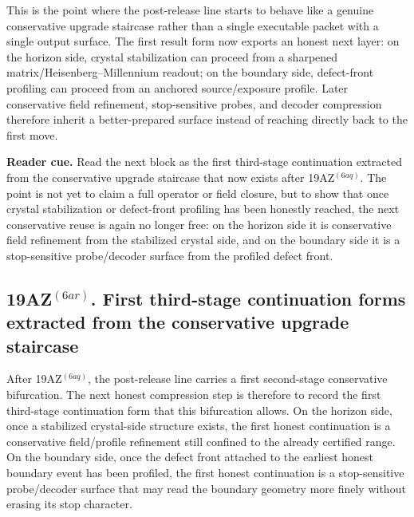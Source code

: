 \begin{remark}
\label{rem:what-the-first-second-stage-follow-on-form-now-buys}
This is the point where the post-release line starts to behave like a genuine conservative upgrade staircase rather than a single executable packet with a single output surface. The first result form now exports an honest next layer: on the horizon side, crystal stabilization can proceed from a sharpened matrix/Heisenberg--Millennium readout; on the boundary side, defect-front profiling can proceed from an anchored source/exposure profile. Later conservative field refinement, stop-sensitive probes, and decoder compression therefore inherit a better-prepared surface instead of reaching directly back to the first move.
\end{remark}



\noindent\textbf{Reader cue.} Read the next block as the first third-stage continuation extracted from the conservative upgrade staircase that now exists after 19AZ$^{(6aq)}$. The point is not yet to claim a full operator or field closure, but to show that once crystal stabilization or defect-front profiling has been honestly reached, the next conservative reuse is again no longer free: on the horizon side it is conservative field refinement from the stabilized crystal side, and on the boundary side it is a stop-sensitive probe/decoder surface from the profiled defect front.

\subsection*{19AZ$^{(6ar)}$. First third-stage continuation forms extracted from the conservative upgrade staircase}
\label{sec:first-third-stage-continuation-forms-extracted-from-the-conservative-upgrade-staircase}
After 19AZ$^{(6aq)}$, the post-release line carries a first second-stage conservative bifurcation. The next honest compression step is therefore to record the first third-stage continuation form that this bifurcation allows. On the horizon side, once a stabilized crystal-side structure exists, the first honest continuation is a conservative field/profile refinement still confined to the already certified range. On the boundary side, once the defect front attached to the earliest honest boundary event has been profiled, the first honest continuation is a stop-sensitive probe/decoder surface that may read the boundary geometry more finely without erasing its stop character.

